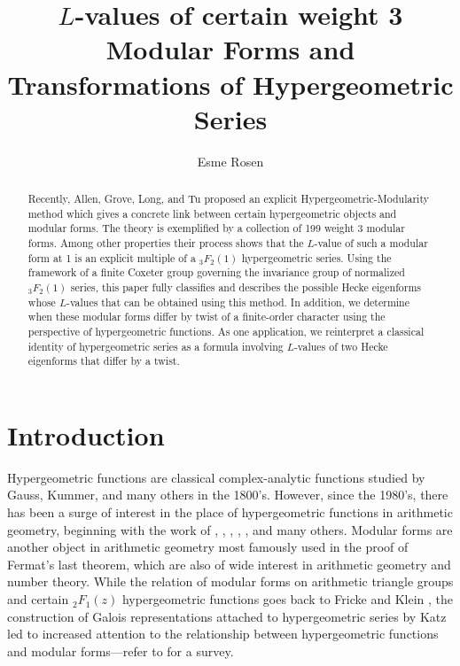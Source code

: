 \documentclass[12pt]{amsart}
\title[Hypergeometric Series and $L$-values of Modular Forms]{$L$-values of certain weight 3 Modular Forms and Transformations of  Hypergeometric Series}
\author{Esme Rosen }
\date{}
\theoremstyle{definition}
\theoremstyle{remark}
\begin{document}
\begin{abstract}
Recently, Allen, Grove, Long, and Tu proposed an explicit Hypergeometric-Modularity method which gives a concrete link between certain hypergeometric objects and modular forms. The theory is exemplified by a collection of  199 weight 3 modular forms. Among other properties their process shows that the  $L$-value  of such a modular form at 1 is an explicit multiple of a ${}_3F_2(1)$ hypergeometric series. Using the framework of a finite Coxeter group governing the invariance group of normalized ${}_3F_2(1)$ series, this paper fully classifies and describes the possible Hecke eigenforms whose $L$-values that can be obtained using this method. In addition, we determine when these modular forms differ by twist of a finite-order character using the perspective of hypergeometric functions.  As one application, we reinterpret a classical identity of hypergeometric series as a formula involving $L$-values of two Hecke eigenforms that differ by a twist. \end{abstract}
\maketitle

\tableofcontents

\section{Introduction}

Hypergeometric functions are classical complex-analytic functions studied by Gauss, Kummer, and many others in the 1800's. However, since the 1980's, there has been a surge of interest in the place of hypergeometric functions in arithmetic geometry, beginning with the work of \cite{beukersheckman}, \cite{greene}, \cite{katz}, \cite{stiller}, \cite{wolfart}, and many others. Modular forms are another object in arithmetic geometry most famously used in the proof of Fermat's last theorem, which are also of wide interest in arithmetic geometry and number theory. While the relation of modular forms on arithmetic triangle groups and certain ${}_2F_1(z)$ hypergeometric functions goes back to Fricke and Klein \cite{frickeklein}, the construction of Galois representations attached to hypergeometric series by Katz \cite{katz} led to increased attention to the relationship between hypergeometric functions and modular forms---refer to \cite{dawseymccarthy} for a survey. 
\end{document}
